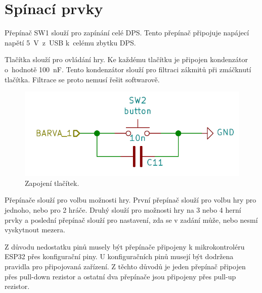   \section{Spínací prvky}
  Přepínač SW1 slouží pro zapínání celé DPS. Tento přepínač připojuje napájecí napětí 5~V~z~USB k~celému zbytku DPS. 

  Tlačítka slouží pro ovládání hry. Ke každému tlačítku je připojen kondenzátor o~hodnotě 100~nF. Tento kondenzátor 
  slouží pro filtraci zákmitů při zmáčknutí tlačítka. Filtrace se proto nemusí řešit softwarově.

  \begin{figure}[!h]
    \begin{center}
      \includegraphics[scale=0.6]{obrazky/Tlacitka_zapojeni.png}
    \end{center}
    \caption[Zapojení tlačítek]{Zapojení tlačítek.}
  \end{figure}

  Přepínače slouží pro volbu možnosti hry. První přepínač slouží pro volbu hry pro jednoho, nebo pro 2 hráče. Druhý 
  slouží pro možnosti hry na 3 nebo 4 herní prvky a poslední přepínač slouží pro nastavení, zda se v zadání může, nebo 
  nesmí vyskytnout mezera. 
  
  Z důvodu nedostatku pinů musely být přepínače připojeny k mikrokontroléru ESP32 přes konfigurační piny. U konfiguračních pinů
  musejí být dodržena pravidla pro připojovaná zařízení.  %
  Z těchto důvodů je jeden přepínač připojen přes pull-down rezistor a ostatní dva přepínače jsou připojeny přes pull-up rezistor. 

